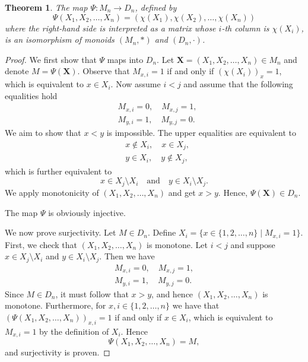 \documentclass[pdflatex,sn-mathphys-num]{sn-jnl}%
\theoremstyle{thmstyleone}%
\newtheorem{theorem}{Theorem}%
\theoremstyle{thmstyletwo}%
\theoremstyle{thmstylethree}%
\begin{document}
\begin{theorem}\label{thm:Psi}
   The map $\Psi : M_n \rightarrow D_n$, defined by
   \[
      \Psi(X_1, X_2, \dots, X_n) = (\chi(X_1), \chi(X_2), \dots, \chi(X_n))
   \]
   where the right-hand side is interpreted as a matrix whose $i$-th column is $\chi(X_i)$, is an isomorphism of monoids $(M_n, \ast)$ and $(D_n, \cdot)$.
\end{theorem}

\begin{proof}
   We first show that $\Psi$ maps into $D_n$. Let $\mathbf{X} = (X_1, X_2, \dots, X_n) \in M_n$ and denote $M = \Psi(\mathbf{X})$.
   Observe that $M_{x, i} = 1$ if and only if $(\chi(X_i))_x = 1$, which is equivalent to $x \in X_i$.
   Now assume $i < j$ and assume that the following equalities hold
   \begin{align*}
      &M_{x, i} = 0, \quad M_{x, j} = 1, \\
      &M_{y, i} = 1, \quad M_{y, j} = 0.
   \end{align*}
   We aim to show that $x < y$ is impossible. 
   The upper equalities are equivalent to 
   \begin{align*}
      &x \notin X_i, \quad x \in X_j, \\
      &y \in X_i, \quad y \notin X_j, 
   \end{align*}
   which is further equivalent to 
   \[ 
      x \in X_j \setminus X_i \quad \text{and} \quad y \in X_i \setminus X_j. 
   \]
   We apply monotonicity of $(X_1, X_2, \dots, X_n)$ and get $x>y$. Hence, $\Psi(\mathbf{X}) \in D_n$.



   The map $\Psi$ is obviously injective.

   We now prove surjectivity. Let $M \in D_n$. Define $X_i = \{x \in \{1, 2, \dots, n\} \mid M_{x, i} = 1\}$. First, we check that $(X_1, X_2, \dots, X_n)$ is monotone.
   Let $i < j$ and suppose $x \in X_j \setminus X_i$ and $y \in X_i \setminus X_j$. Then we have
   \begin{align*}
      M_{x, i} = 0, \quad M_{x, j} = 1, \\
      M_{y, i} = 1, \quad M_{y, j} = 0.
   \end{align*}
   Since $M \in D_n$, it must follow that $x>y$, and hence $(X_1, X_2, \dots, X_n)$ is monotone.
   Furthermore, for $x, i \in \{1, 2, \dots, n\}$ we have that $(\Psi(X_1, X_2, \dots, X_n))_{x, i} = 1$ if and only if $x \in X_i$, which is equivalent to  $M_{x, i} = 1$ by the definition of $X_i$.
   Hence
   \[
   \Psi(X_1, X_2, \dots, X_n) = M,
   \]
   and surjectivity is proven. 



\end{proof}
\end{document}
